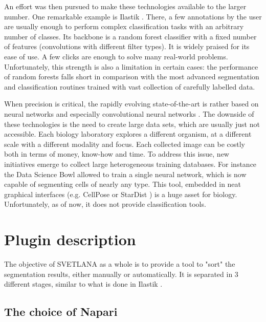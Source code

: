 \documentclass{article}
\begin{document}
An effort was then pursued to make these technologies available to the larger number. One remarkable example is Ilastik \cite{berg2019ilastik}. There, a few annotations by the user are usually enough to perform complex classification tasks with an arbitrary number of classes. Its backbone is a random forest classifier with a fixed number of features (convolutions with different filter types). It is widely praised for its ease of use. A few clicks are enough to solve many real-world problems. Unfortunately, this strength is also a limitation in certain cases: the performance of random forests falls short in comparison with the most advanced segmentation and classification routines trained with vast collection of carefully labelled data. 

When precision is critical, the rapidly evolving state-of-the-art is rather based on neural networks and especially convolutional neural networks \cite{dhillon2020convolutional,8237584}. The downside of these technologies is the need to create large data sets, which are usually just not accessible. Each biology laboratory explores a different organism, at a different scale with a different modality and focus. Each collected image can be costly both in terms of money, know-how and time. To address this issue, new initiatives emerge to collect large heterogeneous training databases. For instance the Data Science Bowl \cite{caicedo2019nucleus} allowed to train a single neural network, which is now capable of segmenting cells of nearly any type. This tool, embedded in neat graphical interfaces (e.g. CellPose \cite{stringer2021cellpose} or StarDist \cite{fazeli2020automated}) is a huge asset for biology. Unfortunately, as of now, it does not provide classification tools.


\section{Plugin description}
\label{sec:format}
{}
The objective of SVETLANA as a whole is to provide a tool to "sort" the segmentation results, either manually or automatically. 
It is separated in 3 different stages, similar to what is done in Ilastik \cite{berg2019ilastik}. 

\subsection{The choice of Napari}
\end{document}
